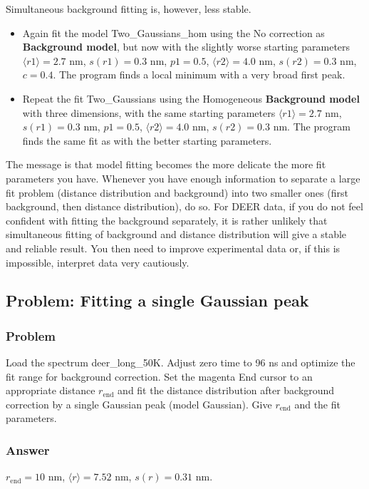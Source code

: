 \documentclass[11pt,a4paper]{article}
\begin{document}
Simultaneous background fitting is, however, less stable.

\begin{itemize}
	\item Again fit the model {\ttfamily Two\_Gaussians\_hom} using the {\ttfamily No correction as \bf Background model}, but now with the slightly worse starting parameters $\langle r1 \rangle = 2.7$ nm, $s(r1) = 0.3$ nm, $p1 = 0.5$, $\langle r2 \rangle = 4.0$ nm, $s(r2) = 0.3$ nm, $c=0.4$. The program finds a local minimum with a very broad first peak.  
	\item Repeat the fit {\ttfamily Two\_Gaussians} using the {\ttfamily Homogeneous \bf Background model} with three dimensions, with the same starting parameters $\langle r1 \rangle = 2.7$ nm, $s(r1) = 0.3$ nm, $p1 = 0.5$, $\langle r2 \rangle = 4.0$ nm, $s(r2) = 0.3$ nm. The program finds the same fit as with the better starting parameters.  
\end{itemize}

The message is that model fitting becomes the more delicate the more fit parameters you have. Whenever you have enough information to separate a large fit problem (distance distribution and background) into two smaller ones (first background, then distance distribution), do so. For DEER data, if you do not feel confident with fitting the background separately, it is rather unlikely that simultaneous fitting of background and distance distribution will give a stable and reliable result. You then need to improve experimental data or, if this is impossible, interpret data very cautiously.

\subsection{Problem: Fitting a single Gaussian peak}

\subsubsection*{Problem}

Load the spectrum {\ttfamily deer\_long\_50K}. Adjust zero time to 96 ns and optimize the fit range for background correction. Set the magenta {\ttfamily End} cursor to an appropriate distance $r_\mathrm{end}$ and fit the distance distribution after background correction by a single Gaussian peak (model {\ttfamily Gaussian}). Give $r_\mathrm{end}$ and the fit parameters.

\subsubsection*{Answer}
$r_\mathrm{end} = 10$ nm, $\langle r \rangle = 7.52$ nm, $s(r) = 0.31$ nm.
\end{document}
